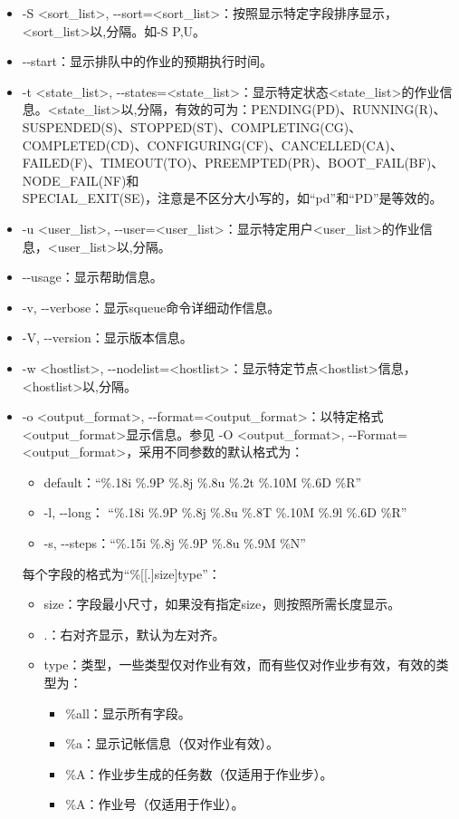 \begin{itemize}
	\item -S <sort\_list>, -{}-sort=<sort\_list>：按照显示特定字段排序显示，<sort\_list>以,分隔。如-S P,U。
	\item -{}-start：显示排队中的作业的预期执行时间。
	\item -t <state\_list>, -{}-states=<state\_list>：显示特定状态<state\_list>的作业信息。<state\_list>以,分隔，有效的可为：PENDING(PD)、RUNNING(R)、SUSPENDED(S)、STOPPED(ST)、COMPLETING(CG)、COMPLETED(CD)、CONFIGURING(CF)、CANCELLED(CA)、FAILED(F)、TIMEOUT(TO)、PREEMPTED(PR)、BOOT\_FAIL(BF)、NODE\_FAIL(NF)和\\SPECIAL\_EXIT(SE)，注意是不区分大小写的，如``pd''和``PD''是等效的。
	\item -u <user\_list>, -{}-user=<user\_list>：显示特定用户<user\_list>的作业信息，<user\_list>以,分隔。
	\item -{}-usage：显示帮助信息。
	\item -v, -{}-verbose：显示squeue命令详细动作信息。
	\item -V, -{}-version：显示版本信息。
	\item -w <hostlist>, -{}-nodelist=<hostlist>：显示特定节点<hostlist>信息，<hostlist>以,分隔。
	\item -o <output\_format>, -{}-format=<output\_format>：以特定格式<output\_format>显示信息。参见 -O <output\_format>, -{}-Format=<output\_format>，采用不同参数的默认格式为：
	\begin{itemize}
		\item default：``\%.18i \%.9P \%.8j \%.8u \%.2t \%.10M \%.6D \%R''
		\item -l, -{}-long： ``\%.18i \%.9P \%.8j \%.8u \%.8T \%.10M \%.9l \%.6D \%R''
		\item -s, -{}-steps：``\%.15i \%.8j \%.9P \%.8u \%.9M \%N''
	\end{itemize}
	每个字段的格式为``\%[[.]size]type''：
\begin{itemize}
	\item size：字段最小尺寸，如果没有指定size，则按照所需长度显示。
    \item .：右对齐显示，默认为左对齐。
	\item type：类型，一些类型仅对作业有效，而有些仅对作业步有效，有效的类型为：
\begin{itemize}
	\item \%all：显示所有字段。
    \item \%a：显示记帐信息（仅对作业有效）。
    \item \%A：作业步生成的任务数（仅适用于作业步）。
    \item \%A：作业号（仅适用于作业）。

\end{itemize}
\end{itemize}
\end{itemize}
